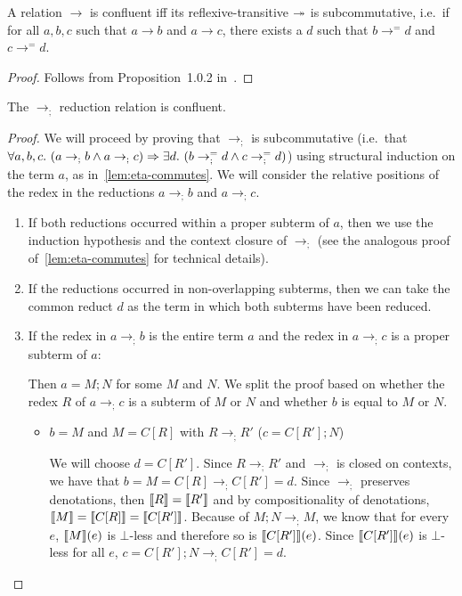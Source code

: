 \begin{lemma}\label{lem:subcommutativity}
  A relation $\to$ is confluent iff its reflexive-transitive $\twoheadrightarrow$ is
  subcommutative, i.e.\ if for all $a, b, c$ such that $a \to b$ and
  $a \to c$, there exists a $d$ such that $b \to^= d$ and $c \to^= d$.
\end{lemma}

\begin{proof}
  Follows from Proposition~1.0.2 in~\cite{klop1992term}.
\end{proof}

\begin{lemma}\label{lem:semicolon-confluent}
  The $\to_;$ reduction relation is confluent.
\end{lemma}

\begin{proof}
  We will proceed by proving that $\to_;$ is subcommutative (i.e.\ that
  $\forall a, b, c.\ (a \to_; b \land a \to_; c) \Rightarrow \exists d.\ (b \to_;^=
  d \land c \to_;^= d)$) using structural induction on the term $a$, as
  in~\ref{lem:eta-commutes}. We will consider the relative positions of the
  redex in the reductions $a \to_; b$ and $a \to_; c$.

  \begin{enumerate}
  \item If both reductions occurred within a proper subterm of $a$, then we
    use the induction hypothesis and the context closure of $\to_;$ (see
    the analogous proof of~\ref{lem:eta-commutes} for technical details).

  \item If the reductions occurred in non-overlapping subterms, then we can
    take the common reduct $d$ as the term in which both subterms have been
    reduced.

  \item If the redex in $a \to_; b$ is the entire term $a$ and the redex in
    $a \to_; c$ is a proper subterm of $a$:

    Then $a = M; N$ for some $M$ and $N$. We split the proof based on
    whether the redex $R$ of $a \to_; c$ is a subterm of $M$ or $N$ and
    whether $b$ is equal to $M$ or $N$.
    \begin{itemize}
    \item $b = M$ and $M = C[R]$ with $R \to_; R'$ ($c = C[R']; N$)

      We will choose $d = C[R']$. Since $R \to_; R'$ and $\to_;$ is closed
      on contexts, we have that $b = M = C[R] \to_; C[R'] = d$. Since
      $\to_;$ preserves denotations, then $\llbracket R \rrbracket = \llbracket R' \rrbracket$ and by
      compositionality of denotations,
      $\llbracket M \rrbracket = \llbracket C[R] \rrbracket = \llbracket C[R'] \rrbracket$. Because of $M; N \to_; M$, we
      know that for every $e$, $\llbracket M \rrbracket(e)$ is $\bot$-less and therefore so
      is $\llbracket C[R'] \rrbracket(e)$. Since $\llbracket C[R'] \rrbracket(e)$ is $\bot$-less for all
      $e$, $c = C[R']; N \to_; C[R'] = d$.


\end{itemize}
\end{enumerate}
\end{proof}
